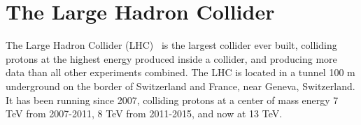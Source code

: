 



\section{The Large Hadron Collider}

The Large Hadron Collider (LHC)~\cite{lhcbrochure} is the largest collider ever built, colliding protons at the highest energy produced inside a collider, and producing more data than all other experiments combined. The LHC is located in a tunnel 100 m underground on the border of Switzerland and France, near Geneva, Switzerland. It has been running since 2007, colliding protons at a center of mass energy 7 TeV from 2007-2011, 8 TeV from 2011-2015, and now at 13 TeV. 

